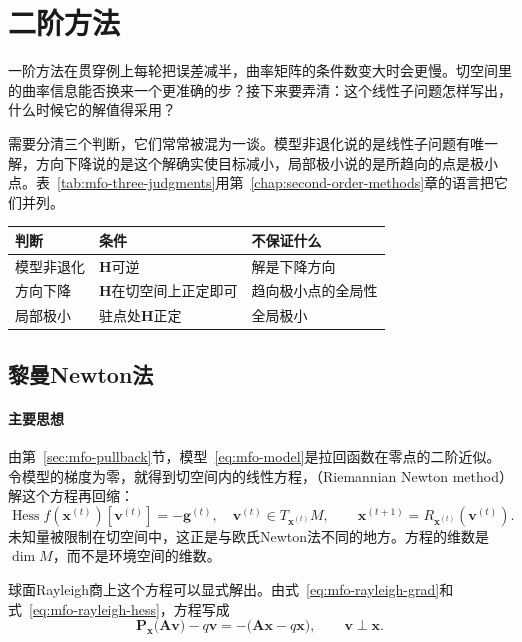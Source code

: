 \section{二阶方法}
\label{sec:mfo-second-order}

一阶方法在贯穿例上每轮把误差减半，曲率矩阵的条件数变大时会更慢。切空间里的曲率信息能否换来一个更准确的步？接下来要弄清：这个线性子问题怎样写出，什么时候它的解值得采用？

需要分清三个判断，它们常常被混为一谈。模型非退化说的是线性子问题有唯一解，方向下降说的是这个解确实使目标减小，局部极小说的是所趋向的点是极小点。表~\ref{tab:mfo-three-judgments}用第~\ref{chap:second-order-methods}章的语言把它们并列。

\begin{BookInlineTable}
 \centering
 \caption{曲率算子的三种判断，$\bm{H}$是当前点的黎曼Hessian。}
 \label{tab:mfo-three-judgments}
 \begin{tabular}{lll}
  \toprule
  判断 & 条件 & 不保证什么\\
  \midrule
  模型非退化 & $\bm{H}$可逆 & 解是下降方向\\
  方向下降 & $\bm{H}$在切空间上正定即可 & 趋向极小点的全局性\\
  局部极小 & 驻点处$\bm{H}$正定 & 全局极小\\
  \bottomrule
 \end{tabular}
\end{BookInlineTable}

\subsection{黎曼Newton法}
\label{sec:mfo-newton}

\paragraph{主要思想}
由第~\ref{sec:mfo-pullback}节，模型~\eqref{eq:mfo-model}是拉回函数在零点的二阶近似。令模型的梯度为零，就得到切空间内的线性方程，（Riemannian Newton method）解这个方程再回缩：
\begin{equation}
 \operatorname{Hess}f(\bm{x}^{(t)})[\bm{v}^{(t)}]=-\bm{g}^{(t)},\quad\bm{v}^{(t)}\in T_{\bm{x}^{(t)}}M,
 \qquad
 \bm{x}^{(t+1)}=R_{\bm{x}^{(t)}}(\bm{v}^{(t)}).
 \label{eq:mfo-newton}
\end{equation}
未知量被限制在切空间中，这正是与欧氏Newton法不同的地方。方程的维数是$\dim M$，而不是环境空间的维数。

球面Rayleigh商上这个方程可以显式解出。由式~\eqref{eq:mfo-rayleigh-grad}和式~\eqref{eq:mfo-rayleigh-hess}，方程写成
\[
 \bm{P}_{\bm{x}}\bigl(\bm{A}\bm{v}\bigr)-q\bm{v}=-\bigl(\bm{A}\bm{x}-q\bm{x}\bigr),\qquad\bm{v}\perp\bm{x}.
\]

